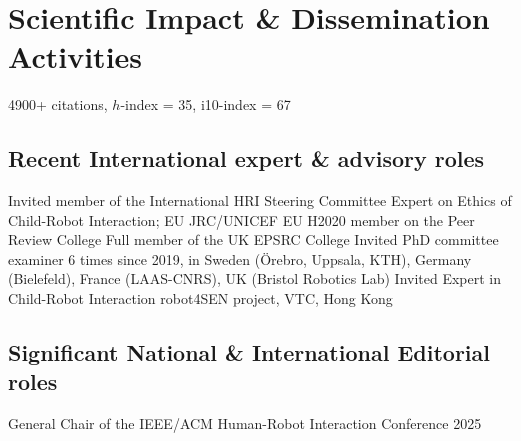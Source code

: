 \documentclass[10pt,a4paper]{moderncv}        %
\begin{document}
\section{Scientific Impact \& Dissemination Activities}

 {} {} {}
\vspace{0.2em} {4900+ citations, $h$-index = 35, i10-index = 67 } {} {} {}

\subsection{Recent International expert \& advisory roles}

 {Invited member of the International HRI Steering Committee} {} {} {} {}
 {Expert on Ethics of Child-Robot Interaction; EU JRC/UNICEF} {} {} {} {}
 {EU H2020 member on the Peer Review College} {} {} {} {}
 {Full member of the UK EPSRC College} {} {} {} {}
 {Invited PhD committee examiner} {6 times since 2019, in Sweden
(Örebro, Uppsala, KTH), Germany (Bielefeld), France (LAAS-CNRS), UK (Bristol
Robotics Lab)} {} {} {}
 {Invited Expert in Child-Robot Interaction} {robot4SEN project, VTC, Hong Kong} {} {} {}

\subsection{Significant National \& International Editorial roles}

 {General Chair of the IEEE/ACM Human-Robot Interaction Conference 2025} {} {} {} {}
 {} {} {}
 {} {} {}
 {} {} {}
\end{document}
